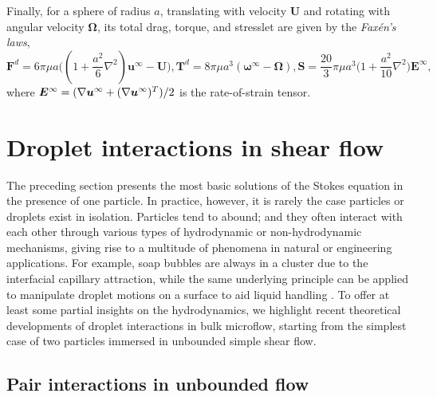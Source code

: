 Finally, for a sphere of radius $a$, translating with velocity $\bm U$ and rotating with angular velocity $\bm \Omega$, its total drag, torque, and stresslet are given by the \emph{Fax\'{e}n's laws},
\begin{subequations} \label{eq:faxen}
 \begin{equation}
   {\bm F}^{d} = 6\pi\mu a\bigg( (1+\frac{a^2}{6}\nabla^2){\bm u^\infty - {\bm U}} \bigg) ,
 \end{equation}
 \begin{equation}
  {\bm T}^{d} = 8\pi\mu a^3 ({\bm \omega}^\infty - {\bm \Omega}),
 \end{equation}
 \begin{equation}
   {\bm S} = \frac{20}{3}\pi\mu a^3 \bigg( 1+\frac{a^2}{10}\nabla^2 \bigg) {\bm E}^\infty ,
 \end{equation}
\end{subequations}
where $\small {\bm E}^\infty=(\nabla {\bm u}^\infty + (\nabla {\bm u}^\infty)^T)/2$ is the rate-of-strain tensor.


\section{Droplet interactions in shear flow}

The preceding section presents the most basic solutions of the Stokes equation in the presence of one particle.
In practice, however, it is rarely the case particles or droplets exist in isolation.
Particles tend to abound; and they often interact with each other through various types of hydrodynamic or non-hydrodynamic mechanisms, giving rise to a multitude of phenomena in natural or engineering applications.
For example, soap bubbles are always in a cluster due to the interfacial capillary attraction, while the same underlying principle can be applied to manipulate droplet motions on a surface to aid liquid handling \citep{vapour-sensing}.
To offer at least some partial insights on the hydrodynamics, we highlight recent theoretical developments of droplet interactions in bulk microflow, starting from the simplest case of two particles immersed in unbounded simple shear flow.

\subsection{Pair interactions in unbounded flow}

